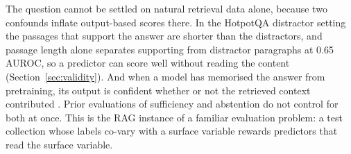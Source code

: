 \documentclass[acmsmall,screen,review]{acmart}
\begin{document}
The question cannot be settled on natural retrieval data alone, because two confounds inflate output-based scores there. In the HotpotQA distractor setting the passages that support the answer are shorter than the distractors, and passage length alone separates supporting from distractor paragraphs at 0.65 AUROC, so a predictor can score well without reading the content (Section~\ref{sec:validity}). And when a model has memorised the answer from pretraining, its output is confident whether or not the retrieved context contributed \citep{mallen2023trust,ren2025investigating}. Prior evaluations of sufficiency and abstention \citep{joren2025sufficient,kirichenko2025abstentionbench,peng2025unanswerability} do not control for both at once. This is the RAG instance of a familiar evaluation problem: a test collection whose labels co-vary with a surface variable rewards predictors that read the surface variable.
\end{document}
